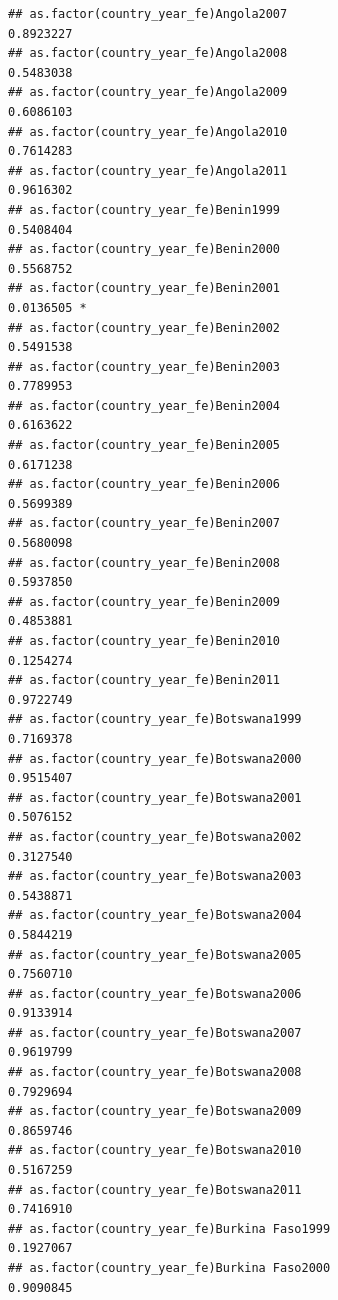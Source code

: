 \documentclass[
  a4paper,
]{article}
\begin{document}
\begin{verbatim}
## as.factor(country_year_fe)Angola2007                           0.8923227    
## as.factor(country_year_fe)Angola2008                           0.5483038    
## as.factor(country_year_fe)Angola2009                           0.6086103    
## as.factor(country_year_fe)Angola2010                           0.7614283    
## as.factor(country_year_fe)Angola2011                           0.9616302    
## as.factor(country_year_fe)Benin1999                            0.5408404    
## as.factor(country_year_fe)Benin2000                            0.5568752    
## as.factor(country_year_fe)Benin2001                            0.0136505 *  
## as.factor(country_year_fe)Benin2002                            0.5491538    
## as.factor(country_year_fe)Benin2003                            0.7789953    
## as.factor(country_year_fe)Benin2004                            0.6163622    
## as.factor(country_year_fe)Benin2005                            0.6171238    
## as.factor(country_year_fe)Benin2006                            0.5699389    
## as.factor(country_year_fe)Benin2007                            0.5680098    
## as.factor(country_year_fe)Benin2008                            0.5937850    
## as.factor(country_year_fe)Benin2009                            0.4853881    
## as.factor(country_year_fe)Benin2010                            0.1254274    
## as.factor(country_year_fe)Benin2011                            0.9722749    
## as.factor(country_year_fe)Botswana1999                         0.7169378    
## as.factor(country_year_fe)Botswana2000                         0.9515407    
## as.factor(country_year_fe)Botswana2001                         0.5076152    
## as.factor(country_year_fe)Botswana2002                         0.3127540    
## as.factor(country_year_fe)Botswana2003                         0.5438871    
## as.factor(country_year_fe)Botswana2004                         0.5844219    
## as.factor(country_year_fe)Botswana2005                         0.7560710    
## as.factor(country_year_fe)Botswana2006                         0.9133914    
## as.factor(country_year_fe)Botswana2007                         0.9619799    
## as.factor(country_year_fe)Botswana2008                         0.7929694    
## as.factor(country_year_fe)Botswana2009                         0.8659746    
## as.factor(country_year_fe)Botswana2010                         0.5167259    
## as.factor(country_year_fe)Botswana2011                         0.7416910    
## as.factor(country_year_fe)Burkina Faso1999                     0.1927067    
## as.factor(country_year_fe)Burkina Faso2000                     0.9090845    

\end{verbatim}
\end{document}
